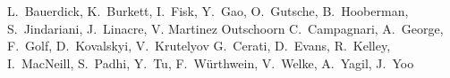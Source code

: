 \begin{Authlist}
%
L.~Bauerdick, K.~Burkett, I.~Fisk, Y.~Gao, O.~Gutsche, B.~Hooberman, S.~Jindariani,  J.~Linacre, V. Martinez Outschoorn
%
C.~Campagnari, A.~George, F.~Golf, D.~Kovalskyi, V.~Krutelyov
%
G.~Cerati, D.~Evans, R.~Kelley, I.~MacNeill, S.~Padhi, Y.~Tu, F.~W\"urthwein, V.~Welke, A.~Yagil, J.~Yoo

\end{Authlist}
